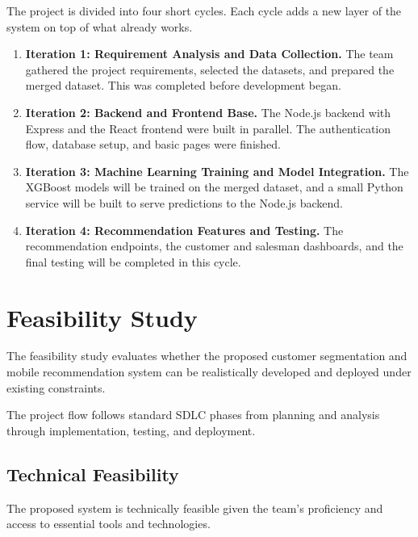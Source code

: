 \documentclass[12pt, a4paper]{report}
\numberwithin{equation}{chapter}
\begin{document}
The project is divided into four short cycles. Each cycle adds a new layer of the system on top of what already works.

\begin{enumerate}[label=\Roman*.]

\item \textbf{Iteration 1: Requirement Analysis and Data Collection.} The team gathered the project requirements, selected the datasets, and prepared the merged dataset. This was completed before development began.

\item \textbf{Iteration 2: Backend and Frontend Base.} The Node.js backend with Express and the React frontend were built in parallel. The authentication flow, database setup, and basic pages were finished.
\item \textbf{Iteration 3: Machine Learning Training and Model Integration.} The XGBoost models will be trained on the merged dataset, and a small Python service will be built to serve predictions to the Node.js backend.

\item \textbf{Iteration 4: Recommendation Features and Testing.} The recommendation endpoints, the customer and salesman dashboards, and the final testing will be completed in this cycle.

\end{enumerate}


\section{Feasibility Study}

The feasibility study evaluates whether the proposed customer segmentation and mobile recommendation system can be realistically developed and deployed under existing constraints.

The project flow follows standard SDLC phases from planning and analysis through implementation, testing, and deployment.

\subsection{Technical Feasibility}

The proposed system is technically feasible given the team's proficiency and access to essential tools and technologies.
\end{document}
